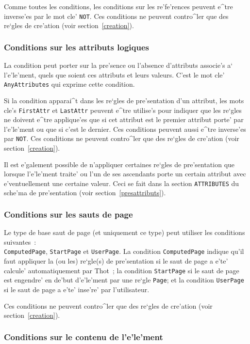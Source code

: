 {Comme toutes les conditions, les conditions sur les re'fe'rences peuvent
e^tre inverse'es par le mot cle' {\tt NOT}.
Ces conditions ne peuvent contro^ler que des re`gles de cre'ation
(voir section~\ref{creation}).

\subsubsection{Conditions sur les attributs logiques}

La condition peut porter sur la pre'sence ou l'absence
d'attributs associe's a` l'e'le'ment, quels que soient ces attributs
et leurs valeurs. C'est le mot cle' {\tt AnyAttributes} qui exprime cette
condition.

Si la condition apparai^t dans les re`gles de pre'sentation d'un attribut,
les mots cle's {\tt FirstAttr} et {\tt LastAttr} peuvent e^tre utilise's
pour indiquer que les re`gles ne doivent e^tre applique'es que si cet
attribut est le premier attribut porte' par l'e'le'ment ou que si
c'est le dernier. Ces conditions peuvent aussi e^tre inverse'es par {\tt NOT}.
Ces conditions ne peuvent contro^ler que des re`gles de cre'ation
(voir section~\ref{creation}).

Il est e'galement possible de n'appliquer certaines re`gles de
pre'sentation que lorsque l'e'le'ment traite' ou l'un de ses ascendants porte
un certain attribut avec e'ventuellement une certaine valeur. Ceci se fait
dans la section {\tt ATTRIBUTES} du sche'ma de pre'sentation (voir
section~\ref{presattributs}).

\subsubsection{Conditions sur les sauts de page}

Le type de base saut de page (et uniquement ce type) peut
utiliser les conditions suivantes~:\\
{\tt ComputedPage}, {\tt StartPage} et {\tt UserPage}.
La condition {\tt ComputedPage} indique qu'il faut appliquer la (ou les)
re`gle(s) de pre'sentation si le saut de page a e'te' calcule'
automatiquement par Thot~; la condition {\tt StartPage} 
si le saut de page est engendre' en de'but d'e'le'ment par une re`gle
{\tt Page}; et la
condition {\tt UserPage} si le saut de page
a e'te' inse're' par l'utilisateur.

Ces conditions ne peuvent contro^ler que des re`gles de cre'ation
(voir section~\ref{creation}).

\subsubsection{Conditions sur le contenu de l'e'le'ment}

}
